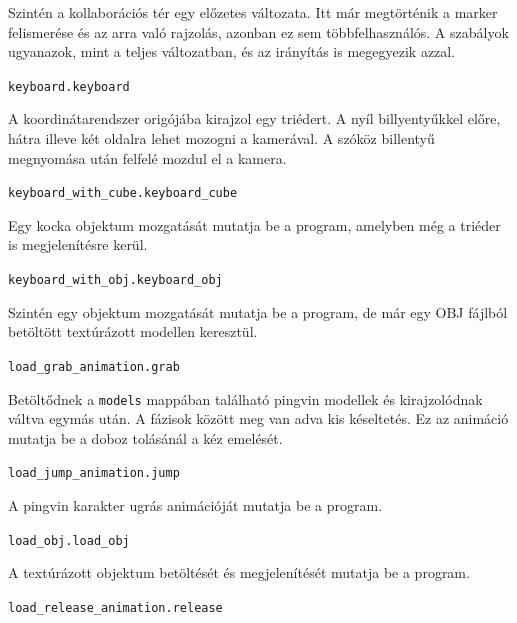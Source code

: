 \medskip
	
Szintén a kollaborációs tér egy előzetes változata.
Itt már megtörténik a marker felismerése és az arra való rajzolás, azonban ez sem többfelhasználós.
A szabályok ugyanazok, mint a teljes változatban, és az irányítás is megegyezik azzal.

\bigskip

\noindent \texttt{keyboard.keyboard}

\medskip
	
A koordinátarendszer origójába kirajzol egy triédert.
A nyíl billyentyűkkel előre, hátra illeve két oldalra lehet mozogni a kamerával.
A szóköz billentyű megnyomása után felfelé mozdul el a kamera.

\bigskip

\noindent \texttt{keyboard\_with\_cube.keyboard\_cube}

\medskip

Egy kocka objektum mozgatását mutatja be a program, amelyben még a triéder is megjelenítésre kerül.
	
\bigskip

\noindent \texttt{keyboard\_with\_obj.keyboard\_obj}

\medskip
	
Szintén egy objektum mozgatását mutatja be a program, de már egy OBJ fájlból betöltött textúrázott modellen keresztül.

\bigskip

\noindent \texttt{load\_grab\_animation.grab}

\medskip
	
Betöltődnek a \texttt{models} mappában található pingvin modellek és kirajzolódnak váltva egymás után. A fázisok között meg van adva kis késeltetés.
Ez az animáció mutatja be a doboz tolásánál a kéz emelését.

\bigskip

\noindent \texttt{load\_jump\_animation.jump}

\medskip

A pingvin karakter ugrás animációját mutatja be a program.

\bigskip

\noindent \texttt{load\_obj.load\_obj}

\medskip

A textúrázott objektum betöltését és megjelenítését mutatja be a program.

\bigskip

\noindent \texttt{load\_release\_animation.release}

